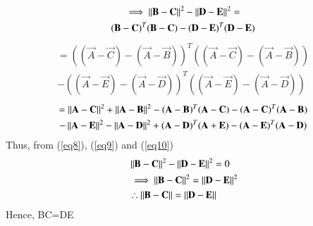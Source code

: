 \documentclass[journal,12pt,twocolumn]{IEEEtran}
\begin{document}
\begin{multline}
\implies \left\lVert\mathbf{B}-\mathbf{C}\right\rVert^2 - \left\lVert\mathbf{D}-\mathbf{E}\right\rVert^2=\\
(\mathbf B -\mathbf C)^T(\mathbf{B}-\mathbf{C})-(\mathbf D -\mathbf E)^T(\mathbf{D}-\mathbf{E})\label{eq11}
\end{multline}
\begin{multline}
=((\vec A -\vec C)-(\vec A -\vec B))^T((\vec A -\vec C)-(\vec A -\vec B))\\-((\vec A -\vec E)-(\vec A -\vec D))^T((\vec A -\vec E)-(\vec A -\vec D))\label{eq12}
\end{multline}
\begin{multline}
=\left\lVert\mathbf{A}-\mathbf{C}\right\rVert^2 + \left\lVert\mathbf{A}-\mathbf{B}\right\rVert^2- (\mathbf A -\mathbf B)^T(\mathbf{A}-\mathbf{C})-(\mathbf{A}-\mathbf{C})^T(\mathbf{A}-\mathbf{B})\\
-\left\lVert\mathbf{A}-\mathbf{E}\right\rVert^2 - \left\lVert\mathbf{A}-\mathbf{D}\right\rVert^2+ (\mathbf A -\mathbf D)^T(\mathbf{A}+\mathbf{E})-(\mathbf{A}-\mathbf{E})^T(\mathbf{A}-\mathbf{D})\label{eq13}
\end{multline}
Thus, from (\ref{eq8}), (\ref{eq9}) and (\ref{eq10})
\begin{align}
& \left\lVert\mathbf{B}-\mathbf{C}\right\rVert^2 - \left\lVert\mathbf{D}-\mathbf{E}\right\rVert^2=0\label{eq14}\\ 
& \implies \left\lVert\mathbf{B}-\mathbf{C}\right\rVert^2 = \left\lVert\mathbf{D}-\mathbf{E}\right\rVert^2 \label{eq15}\\
	& \therefore\left\lVert\mathbf{B}-\mathbf{C}\right\rVert = \left\lVert\mathbf{D}-\mathbf{E}\right\rVert\label{eq16}
\end{align}
Hence, BC=DE
\end{document}
